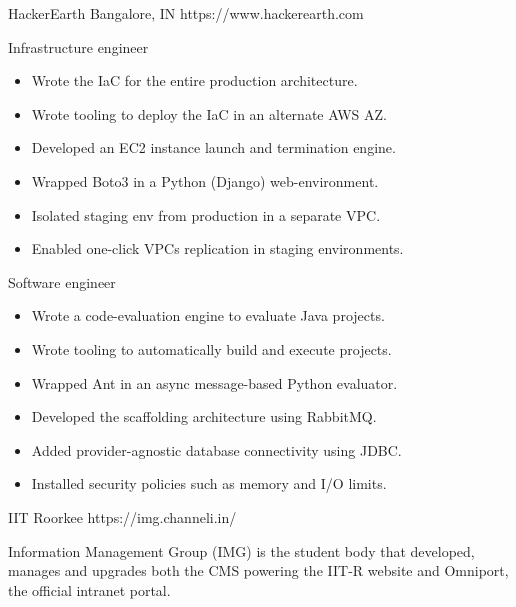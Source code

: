 
\organisationsubsection
  {HackerEarth}
  {Bangalore, IN}
  {https://www.hackerearth.com}

\rolesubsubsection
  {Infrastructure engineer}
  {}

\begin{sectiondescription}
  \begin{itemize}[nosep, leftmargin = *]
    \item Wrote the IaC for the entire production architecture.
    \item Wrote tooling to deploy the IaC in an alternate AWS AZ.
    \item Developed an EC2 instance launch and termination engine.
    \item Wrapped Boto3 in a Python (Django) web-environment.
    \item Isolated staging env from production in a separate VPC.
    \item Enabled one-click VPCs replication in staging environments.
  \end{itemize}
\end{sectiondescription}

\rolesubsubsection
  {Software engineer}
  {}

\begin{sectiondescription}
  \begin{itemize}[nosep, leftmargin = *]
    \item Wrote a code-evaluation engine to evaluate Java projects.
    \item Wrote tooling to automatically build and execute projects.
    \item Wrapped Ant in an async message-based Python evaluator.
    \item Developed the scaffolding architecture using RabbitMQ.
    \item Added provider-agnostic database connectivity using JDBC.
    \item Installed security policies such as memory and I/O limits.
  \end{itemize}
\end{sectiondescription}



  {IIT Roorkee}
  {https://img.channeli.in/}

\begin{sectiondescription}
  Information Management Group (IMG) is the student body that developed, manages
  and upgrades both the CMS powering the IIT-R website and Omniport, the
  official intranet portal.
\end{sectiondescription}

